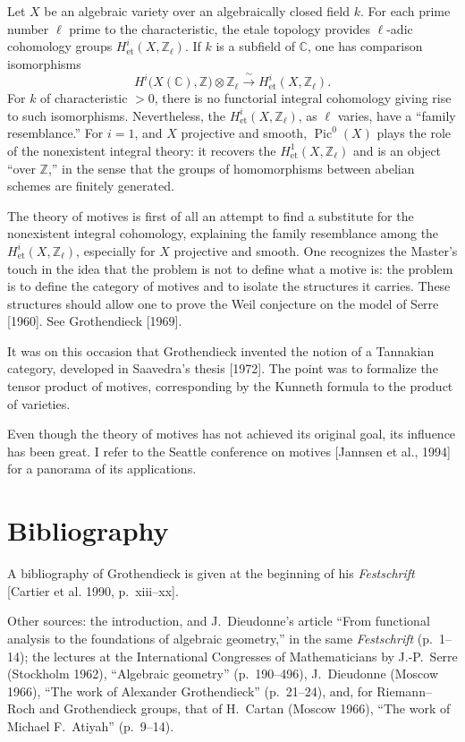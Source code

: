\documentclass[11pt,a4paper]{article}
\theoremstyle{plain}
\theoremstyle{definition}
\DeclareMathOperator{\Pic}{Pic}
\begin{document}
Let $X$ be an algebraic variety over an algebraically closed field $k$. For each prime number $\ell$ prime to the characteristic, the etale topology provides $\ell$-adic cohomology groups $H^i_{\text{et}}(X,\mathbb{Z}_\ell)$. If $k$ is a subfield of $\mathbb{C}$, one has comparison isomorphisms
\[
H^i\bigl(X(\mathbb{C}),\mathbb{Z}\bigr)\otimes\mathbb{Z}_\ell\xrightarrow{\;\sim\;}H^i_{\text{et}}(X,\mathbb{Z}_\ell).
\]
For $k$ of characteristic $>0$, there is no functorial integral cohomology giving rise to such isomorphisms. Nevertheless, the $H^i_{\text{et}}(X,\mathbb{Z}_\ell)$, as $\ell$ varies, have a ``family resemblance.'' For $i=1$, and $X$ projective and smooth, $\Pic^0(X)$ plays the role of the nonexistent integral theory: it recovers the $H^1_{\text{et}}(X,\mathbb{Z}_\ell)$ and is an object ``over $\mathbb{Z}$,'' in the sense that the groups of homomorphisms between abelian schemes are finitely generated.

The theory of motives is first of all an attempt to find a substitute for the nonexistent integral cohomology, explaining the family resemblance among the $H^i_{\text{et}}(X,\mathbb{Z}_\ell)$, especially for $X$ projective and smooth. One recognizes the Master's touch in the idea that the problem is not to define what a motive is: the problem is to define the category of motives and to isolate the structures it carries. These structures should allow one to prove the Weil conjecture on the model of Serre [1960]. See Grothendieck [1969].

It was on this occasion that Grothendieck invented the notion of a Tannakian category, developed in Saavedra's thesis [1972]. The point was to formalize the tensor product of motives, corresponding by the Kunneth formula to the product of varieties.

Even though the theory of motives has not achieved its original goal, its influence has been great. I refer to the Seattle conference on motives [Jannsen et al., 1994] for a panorama of its applications.

\section*{Bibliography}

A bibliography of Grothendieck is given at the beginning of his \emph{Festschrift} [Cartier et al. 1990, p.~xiii--xx].

Other sources: the introduction, and J.~Dieudonne's article ``From functional analysis to the foundations of algebraic geometry,'' in the same \emph{Festschrift} (p.~1--14); the lectures at the International Congresses of Mathematicians by J.-P.~Serre (Stockholm 1962), ``Algebraic geometry'' (p.~190--496), J.~Dieudonne (Moscow 1966), ``The work of Alexander Grothendieck'' (p.~21--24), and, for Riemann--Roch and Grothendieck groups, that of H.~Cartan (Moscow 1966), ``The work of Michael F.~Atiyah'' (p.~9--14).
\end{document}
